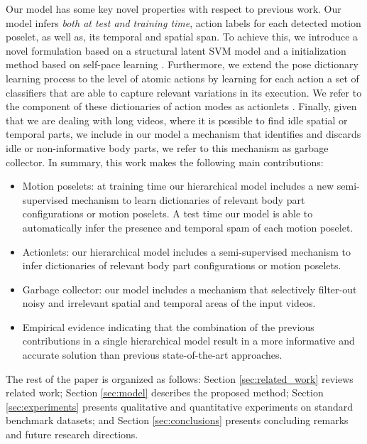 Our model has some key novel properties with respect to previous work.
Our model infers \emph{both at test and training time},
action labels for each detected motion poselet, as 
well as, its temporal and spatial span. To achieve this, we introduce a novel 
formulation based on a structural latent SVM model \cite{Yu:Joachims:2010} and a 
initialization method based on self-pace learning \cite{Kumar:EtAl:2010}. 
Furthermore, we extend the pose dictionary learning process to the level of 
atomic actions by learning for each action a set of classifiers that are able to 
capture relevant variations in its execution. We refer to the component of these 
dictionaries of action modes as actionlets \cite{Wang2012}. Finally, given 
that we are dealing with long videos, where it is possible to find idle spatial 
or temporal parts, we include in our model a mechanism that identifies and 
discards idle or non-informative body parts, we refer to this mechanism as 
garbage collector. In summary, this work makes the following main 
contributions:

\begin{itemize}

\item Motion poselets: at training time our hierarchical model includes a 
new semi-supervised mechanism to learn dictionaries of relevant body 
part configurations or motion poselets. A test time our model is able to 
automatically infer the presence and temporal spam of each motion poselet.


\item Actionlets: our hierarchical model includes a 
semi-supervised mechanism to infer dictionaries of relevant body 
part configurations or motion poselets. 

\item Garbage collector: our model includes a mechanism that
selectively filter-out noisy and irrelevant spatial and temporal areas of the
input videos.

 \item Empirical evidence indicating that the 
combination of the previous
contributions in a single hierarchical model result in a more informative and 
accurate solution than previous state-of-the-art approaches.

\end{itemize}

The rest of the paper is organized as follows:
Section \ref{sec:related_work} reviews related work;
Section \ref{sec:model} describes the proposed method;
Section \ref{sec:experiments}  presents qualitative and quantitative experiments
on standard benchmark datasets;
and Section \ref{sec:conclusions} presents concluding remarks and future research
directions.
